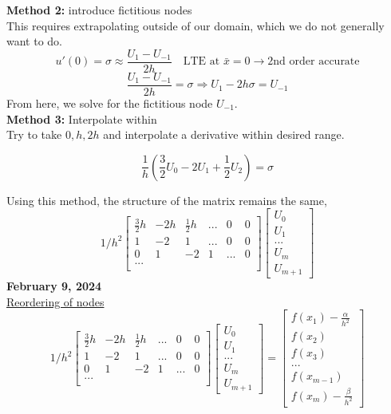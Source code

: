 \documentclass[10pt]{article}
\newcommand{\1}{\mathbb{1}}
\begin{document}
\textbf{Method 2:} introduce fictitious nodes\\
This requires extrapolating outside of our domain, which we do not generally want to do.
\[u'(0) = \sigma \approx \frac{U_1 - U_{-1}}{2h} \quad \text{LTE at } \bar{x} = 0 \rightarrow \text{2nd order accurate}\]
\[\frac{U_1 - U_{-1}}{2h} = \sigma \Rightarrow U_{1} - 2h\sigma = U_{-1}\]
From here, we solve for the fictitious node $U_{-1}$.\\

\textbf{Method 3:} Interpolate within\\
Try to take $0, h, 2h$ and interpolate a derivative within desired range.

\[\frac{1}{h} \left(\frac{3}{2} U_0 - 2U_1 + \frac{1}{2}U_2\right) = \sigma\]

Using this method, the structure of the matrix remains the same,
\[ 1/h^2
    \begin{bmatrix}
        \frac{3}{2} h & -2h & \frac{1}{2}h & ... & 0 & 0\\
        1 & -2 & 1 & ... & 0 & 0\\
        0 & 1 & -2 & 1 & ... & 0\\
        ...\\
    \end{bmatrix}
\begin{bmatrix}
U_0\\
U_1\\
...\\
U_m\\
U_{m+1}
\end{bmatrix}\]
\newpage
\textbf{February 9, 2024}\\

\underline{Reordering of nodes}\\

\[ 1/h^2
    \begin{bmatrix}
        \frac{3}{2} h & -2h & \frac{1}{2}h & ... & 0 & 0\\
        1 & -2 & 1 & ... & 0 & 0\\
        0 & 1 & -2 & 1 & ... & 0\\
        ...\\
    \end{bmatrix}
\begin{bmatrix}
U_0\\
U_1\\
...\\
U_m\\
U_{m+1}
\end{bmatrix}
=
\begin{bmatrix}
    f(x_1) - \frac{\alpha}{h^2}\\
    f(x_2)\\
    f(x_3)\\
    ...\\
    f(x_{m-1})\\
    f(x_m) - \frac{\beta}{h^2}
\end{bmatrix}
\]
\end{document}
